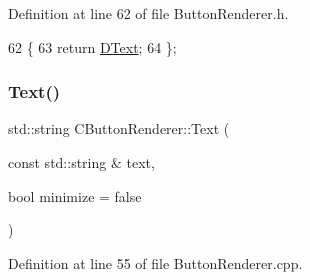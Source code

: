 Definition at line 62 of file Button\+Renderer.\+h.


\begin{DoxyCode}
62                               \{
63             \textcolor{keywordflow}{return} \hyperlink{classCButtonRenderer_a8f058166dec8d1c73adc009e4c436092}{DText};   
64         \};
\end{DoxyCode}
\hypertarget{classCButtonRenderer_a565c9c19612bc2c7fb29a22f18b74d13}{}\label{classCButtonRenderer_a565c9c19612bc2c7fb29a22f18b74d13} 
\subsubsection{\texorpdfstring{Text()}{Text()}\hspace{0.1cm}{\footnotesize\ttfamily [2/2]}}
{\footnotesize\ttfamily std\+::string C\+Button\+Renderer\+::\+Text (\begin{DoxyParamCaption}\item[{const std\+::string \&}]{text,  }\item[{bool}]{minimize = {\ttfamily false} }\end{DoxyParamCaption})}



Definition at line 55 of file Button\+Renderer.\+cpp.


